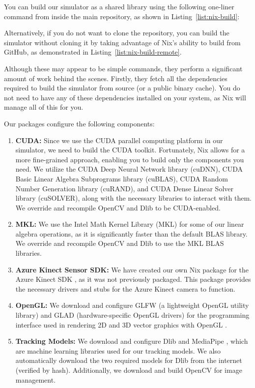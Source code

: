 You can build our simulator as a shared library using the following one-liner command from inside the main repository, as shown in Listing~\ref{list:nix-build}:

Alternatively, if you do not want to clone the repository, you can build the simulator without cloning it by taking advantage of Nix's ability to build from GitHub, as demonstrated in Listing~\ref{list:nix-build-remote}.

Although these may appear to be simple commands, they perform a significant amount of work behind the scenes. Firstly, they fetch all the dependencies required to build the simulator from source (or a public binary cache). You do not need to have any of these dependencies installed on your system, as Nix will manage all of this for you.

Our packages configure the following components:
\begin{enumerate}
	\item \textbf{CUDA:} Since we use the CUDA parallel computing platform \cite{4541126} in our simulator, we need to build the CUDA toolkit. Fortunately, Nix allows for a more fine-grained approach, enabling you to build only the components you need. We utilize the CUDA Deep Neural Network library (cuDNN), CUDA Basic Linear Algebra Subprograms library (cuBLAS), CUDA Random Number Generation library (cuRAND), and CUDA Dense Linear Solver library (cuSOLVER), along with the necessary libraries to interact with them. We override and recompile OpenCV and Dlib to be CUDA-enabled.

	\item \textbf{MKL:} We use the Intel Math Kernel Library (MKL) \cite{Wang2014} for some of our linear algebra operations, as it is significantly faster than the default BLAS library. We override and recompile OpenCV and Dlib to use the MKL BLAS libraries.

	\item \textbf{Azure Kinect Sensor SDK:} We have created our own Nix package for the Azure Kinect SDK \cite{noauthor_microsoftazure-kinect-sensor-sdk_2024}, as it was not previously packaged. This package provides the necessary drivers and stubs for the Azure Kinect camera to function.

	\item \textbf{OpenGL:} We download and configure GLFW \cite{noauthor_glfwglfw_2024} (a lightweight OpenGL utility library) and GLAD \cite{herberth_dav1ddeglad_2024} (hardware-specific OpenGL drivers) for the programming interface used in rendering 2D and 3D vector graphics with OpenGL \cite{woo1999opengl}.

	\item \textbf{Tracking Models:} We download and configure Dlib \cite{dlib09} and MediaPipe \cite{lugaresi2019mediapipe}, which are machine learning libraries used for our tracking models. We also automatically download the two required models for Dlib from the internet (verified by hash). Additionally, we download and build OpenCV for image management.
\end{enumerate}

